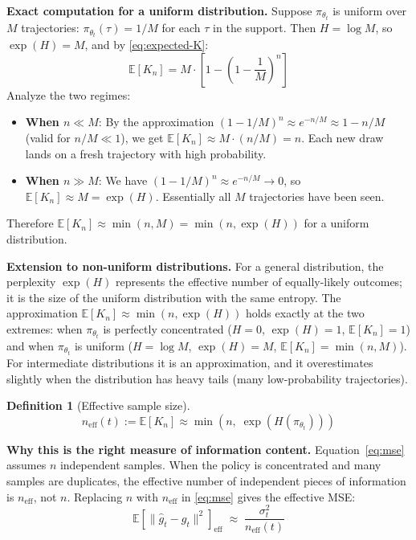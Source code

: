 \documentclass[11pt,a4paper]{article}
\newcommand{\E}{\mathbb{E}}
\newcommand{\neff}{n_{\mathrm{eff}}}
\newcommand{\ghat}{\hat{g}_t}
\newcommand{\gtrue}{g_t}
\newcommand{\pith}{\pi_{\theta_t}}
\newtheorem{definition}{Definition}
\begin{document}
\textbf{Exact computation for a uniform distribution.}
Suppose $\pith$ is uniform over $M$ trajectories: $\pith(\tau) = 1/M$ for each $\tau$ in the support.
Then $H = \log M$, so $\exp(H) = M$, and by \eqref{eq:expected-K}:
\begin{equation}
  \E[K_n] = M\cdot\left[1 - \left(1 - \frac{1}{M}\right)^n\right]
  \label{eq:uniform-Kn}
\end{equation}
Analyze the two regimes:
\begin{itemize}
  \item \textbf{When $n \ll M$}: By the approximation $(1 - 1/M)^n \approx e^{-n/M} \approx 1 - n/M$
    (valid for $n/M \ll 1$), we get $\E[K_n] \approx M \cdot (n/M) = n$.
    Each new draw lands on a fresh trajectory with high probability.
  \item \textbf{When $n \gg M$}: We have $(1-1/M)^n \approx e^{-n/M} \to 0$,
    so $\E[K_n] \approx M = \exp(H)$.
    Essentially all $M$ trajectories have been seen.
\end{itemize}
Therefore $\E[K_n] \approx \min(n, M) = \min(n, \exp(H))$ for a uniform distribution.

\textbf{Extension to non-uniform distributions.}
For a general distribution, the perplexity $\exp(H)$ represents the effective number of
equally-likely outcomes; it is the size of the uniform distribution with the same entropy.
The approximation $\E[K_n] \approx \min(n, \exp(H))$ holds exactly at the two extremes:
when $\pith$ is perfectly concentrated ($H = 0$, $\exp(H) = 1$, $\E[K_n] = 1$)
and when $\pith$ is uniform ($H = \log M$, $\exp(H) = M$, $\E[K_n] = \min(n, M)$).
For intermediate distributions it is an approximation,
and it overestimates slightly when the distribution has heavy tails
(many low-probability trajectories).

\begin{definition}[Effective sample size]
  \label{def:neff}
  \begin{equation}
    \neff(t) := \E[K_n] \approx \min\!\left(n,\; \exp(H(\pith))\right)
    \label{eq:neff-def}
  \end{equation}
\end{definition}

\textbf{Why this is the right measure of information content.}
Equation~\eqref{eq:mse} assumes $n$ independent samples.
When the policy is concentrated and many samples are duplicates, the effective number of
independent pieces of information is $\neff$, not $n$.
Replacing $n$ with $\neff$ in \eqref{eq:mse} gives the effective MSE:
\begin{equation}
  \E\!\left[\|\ghat - \gtrue\|^2\right]_{\mathrm{eff}}
  \;\approx\;
  \frac{\sigma_t^2}{\neff(t)}
  \label{eq:mse-neff}
\end{equation}
\end{document}

